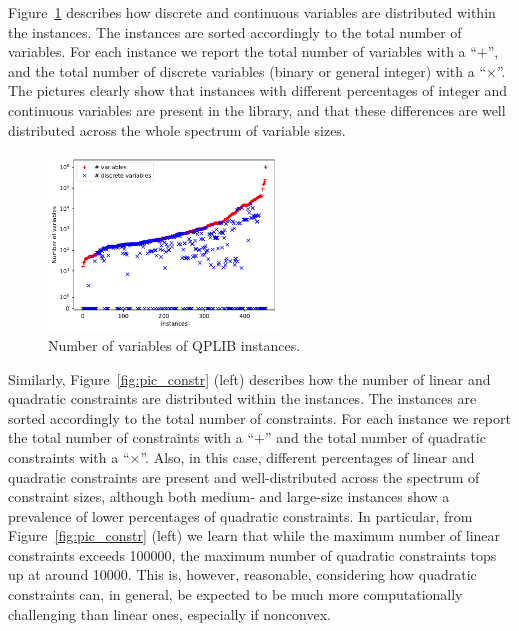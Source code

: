 Figure~\ref{fig:pic_var}
describes how discrete and continuous
variables are distributed within the instances. The instances are
sorted accordingly to the total number of variables.
For each instance we report the total number of variables with a ``$+$'', and the total number of discrete variables (binary or general integer) with a ``$\times$''. The pictures clearly show that instances with different percentages of integer and continuous variables are present in the library, and that these differences are well distributed across the whole spectrum of variable sizes.

\begin{figure}\centering
  \includegraphics[width=0.55\textwidth]{pic_var.pdf}
  \caption{Number of variables of QPLIB instances. \label{fig:pic_var}}
\end{figure}

Similarly, Figure~\ref{fig:pic_constr} (left)
describes how the number of linear and quadratic
constraints are distributed within the instances. The instances are sorted
accordingly to the total number of constraints.
For each instance we report the total number of constraints with a ``$+$''
and the total number of quadratic constraints
with a ``$\times$''. Also, in this case, different percentages of linear and
quadratic constraints are present and well-distributed across the spectrum
of constraint sizes, although both medium- and large-size instances show a
prevalence of lower percentages of quadratic constraints. In particular,
from Figure~\ref{fig:pic_constr} (left) we learn that while the maximum number
of linear constraints exceeds 100000, the maximum number of quadratic
constraints tops up at around 10000. This is, however, reasonable, considering
how quadratic constraints can, in general, be expected to be much more
computationally challenging than linear ones, especially if nonconvex.

